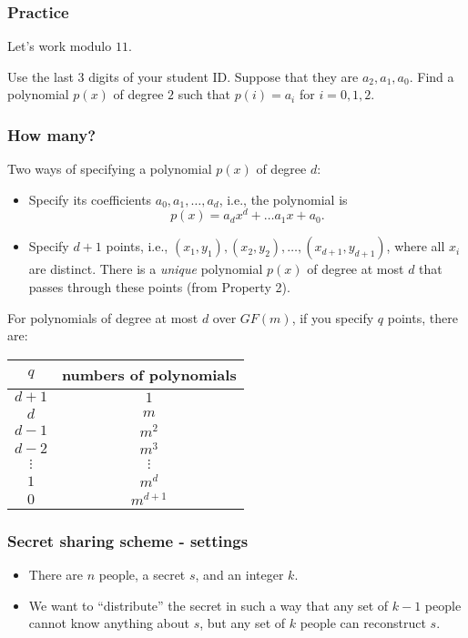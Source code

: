 \begin{frame}
  \frametitle{Practice}

  Let's work modulo $11$.

  Use the last 3 digits of your student ID.  Suppose that they are
  $a_2,a_1,a_0$.  Find a polynomial $p(x)$ of degree $2$ such that
  $p(i)=a_i$ for $i=0,1,2$.

  \vspace{2.5in}
  
\end{frame}

\begin{frame}
  \frametitle{How many?}
\end{frame}

\begin{frame}
  Two ways of specifying a polynomial $p(x)$ of degree $d$:
  \begin{itemize}
  \item Specify its coefficients $a_0,a_1,\ldots,a_d$, i.e., the
    polynomial is
    \[
    p(x) = a_d x^d + \ldots a_1 x + a_0.
    \]
    \pause
  \item Specify $d+1$ points, i.e.,
    $(x_1,y_1),(x_2,y_2),\ldots,(x_{d+1},y_{d+1})$, where all $x_i$
    are distinct.  There is a {\em unique} polynomial $p(x)$ of degree
    at most $d$ that passes through these points (from Property 2).
  \end{itemize}
\end{frame}

\begin{frame}
  For polynomials of degree at most $d$ over $GF(m)$, if you specify
  $q$ points, there are:
  
  \begin{tabular}{c|c}
    $q$ & numbers of polynomials \\
    \hline
    $d+1$ & $1$ \\
    $d$ & $m$ \\
    $d-1$ & $m^2$ \\
    $d-2$ & $m^3$ \\
    $\vdots$ & $\vdots$ \\
    $1$ & $m^d$ \\
    $0$ & $m^{d+1}$
  \end{tabular}
\end{frame}

\begin{frame}
  \frametitle{Secret sharing scheme - settings}
  \pause
  \begin{itemize}
  \item There are $n$ people, a secret $s$, and an integer $k$.
  \item We want to ``distribute'' the secret in such a way that any
    set of $k-1$ people cannot know anything about $s$, but any set of
    $k$ people can reconstruct $s$.
  \end{itemize}
\end{frame}


